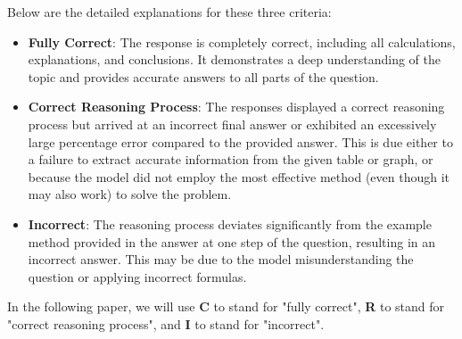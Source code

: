 \documentclass[12pt]{article}
\begin{document}
Below are the detailed explanations for these three criteria:

\begin{itemize}
    \item \textbf{Fully Correct}: The response is completely correct, including all calculations, explanations, and conclusions. It demonstrates a deep understanding of the topic and provides accurate answers to all parts of the question.
    \item \textbf{Correct Reasoning Process}: The responses displayed a correct reasoning process but arrived at an incorrect final answer or exhibited an excessively large percentage error compared to the provided answer. This is due either to a failure to extract accurate information from the given table or graph, or because the model did not employ the most effective method (even though it may also work) to solve the problem. 
    \item \textbf{Incorrect}: The reasoning process deviates significantly from the example method provided in the answer at one step of the question, resulting in an incorrect answer. This may be due to the model misunderstanding the question or applying incorrect formulas.
\end{itemize}
In the following paper, we will use \textbf{C} to stand for "fully correct", \textbf{R} to stand for "correct reasoning process", and \textbf{I} to stand for "incorrect".
\end{document}
